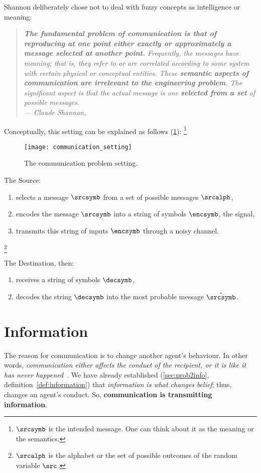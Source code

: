 Shannon deliberately chose not to deal with fuzzy concepts as intelligence or meaning:
\begin{quotation}
	\small \emph{ \textbf{The fundamental problem of communication is that of reproducing at one point either exactly or approximately a message selected at another point.} Frequently, the messages have meaning; that is, they refer to or are correlated according to some system with certain physical or conceptual entities. These \textbf{semantic aspects of communication are irrelevant to the engineering problem}. The significant aspect is that the actual message is one \textbf{selected from a set} of possible messages.\\
	\flushright --- Claude Shannon,~\\}
	\vspace{1cm}
\end{quotation}

Conceptually, this setting can be explained as follows (\cref{fig:communication_setting}): \footnote{\(\srcsymb\) is the intended message. One can think about it as the meaning or the semantics.}

\begin{figure}[hbt!]
	\centering
	\texttt{[image: communication\_setting]}
	\caption{The communication problem setting.}\label{fig:communication_setting}
\end{figure}


The Source:
\begin{enumerate}
	\item selects a message  $\srcsymb$ from a set of possible messages $\srcalph$,
	\item encodes the message $\srcsymb$ into a string of symbols $\encsymb$, the signal,
	\item transmits this string of inputs $\encsymb$ through a noisy channel.
\end{enumerate}
\footnote{\(\srcalph\) is the alphabet or the set of possible outcomes of the random variable \(\src\).}

The Destination, then:
\begin{enumerate}
	\item receives a string of symbols \(\decsymb\),
	\item decodes the string \(\decsymb\) into the most probable message \(\hat{\srcsymb}\).
\end{enumerate}

\section{Information} The reason for communication is to change another agent's behaviour. In other words, \emph{communication either affects the conduct of the recipient, or it is like it has never happened}~\cite[p.100]{shannon:1948}. We have already established (\cref{sec:prob2info}, definition~\ref{def:information}) that \emph{information is what changes belief}; thus, changes an agent's conduct. So, \textbf{communication is transmitting information}.

